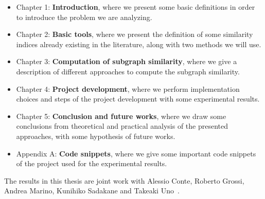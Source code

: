 \begin{itemize}
	\item Chapter 1: \textbf{Introduction},  where we present some basic definitions in order to introduce the problem we are analyzing.
	
	\item Chapter 2: \textbf{Basic tools}, where we present the definition of some similarity indices already existing in the literature, along with two methods we will use.
	
	\item Chapter 3: \textbf{Computation of subgraph similarity}, where we give a description of different approaches to compute the subgraph similarity.
	
	\item Chapter 4: \textbf{Project development}, where we perform implementation choices and steps of the project development with some experimental results.
	
	\item Chapter 5: \textbf{Conclusion and future works}, where we draw some conclusions from theoretical and practical analysis of the presented approaches, with some hypothesis of future works.
	
	\item Appendix A: \textbf{Code snippets}, where we give some important code snippets of the project used for the experimental results.
\end{itemize}

The results in this thesis are joint work with Alessio Conte, Roberto Grossi, Andrea Marino, Kunihiko Sadakane and Takeaki Uno~\cite{SubSim}.